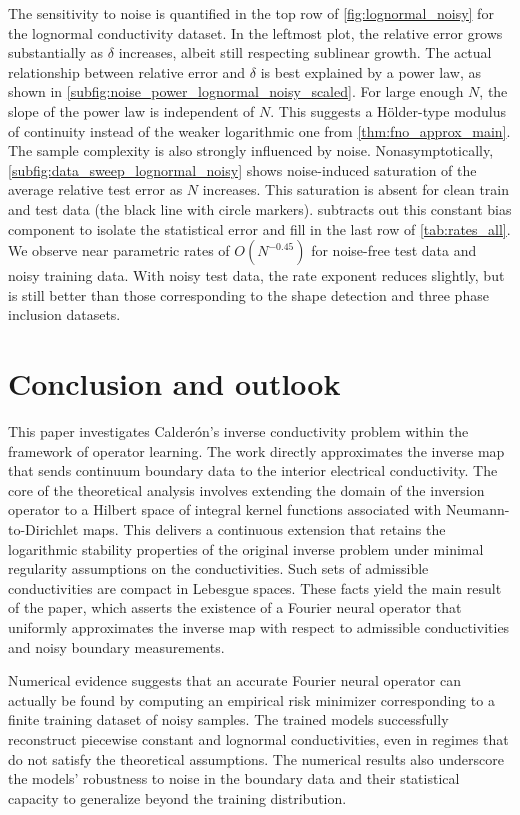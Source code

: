 \documentclass[pdflatex,sn-mathphys-num]{sn-jnl-preprint}
\theoremstyle{thmstyleone}%
\theoremstyle{thmstyletwo}%
\theoremstyle{thmstylethree}%
\numberwithin{equation}{section}
\numberwithin{theorem}{section}
\begin{document}
The sensitivity to noise is quantified in the top row of \cref{fig:lognormal_noisy} for the lognormal conductivity dataset. In the leftmost plot, the relative error grows substantially as $\delta$ increases, albeit still respecting sublinear growth. The actual relationship between relative error and $\delta$ is best explained by a power law, as shown in \cref{subfig:noise_power_lognormal_noisy_scaled}. For large enough $N$, the slope of the power law is independent of $N$. This suggests a H\"older-type modulus of continuity instead of the weaker logarithmic one from \cref{thm:fno_approx_main}. The sample complexity is also strongly influenced by noise. Nonasymptotically, \cref{subfig:data_sweep_lognormal_noisy} shows noise-induced saturation of the average relative test error as $N$ increases. This saturation is absent for clean train and test data (the black line with circle markers).  subtracts out this constant bias component to isolate the statistical error and fill in the last row of \cref{tab:rates_all}. We observe near parametric rates of $O(N^{-0.45})$ for noise-free test data and noisy training data. With noisy test data, the rate exponent reduces slightly, but is still better than those corresponding to the shape detection and three phase inclusion datasets.

\section{Conclusion and outlook}\label{sec:conclusion}
This paper investigates Calder\'on's inverse conductivity problem within the framework of operator learning. The work directly approximates the inverse map that sends continuum boundary data to the interior electrical conductivity. The core of the theoretical analysis involves extending the domain of the inversion operator to a Hilbert space of integral kernel functions associated with Neumann-to-Dirichlet maps. This delivers a continuous extension that retains the logarithmic stability properties of the original inverse problem under minimal regularity assumptions on the conductivities. Such sets of admissible conductivities are compact in Lebesgue spaces. These facts yield the main result of the paper, which asserts the existence of a Fourier neural operator that uniformly approximates the inverse map with respect to admissible conductivities and noisy boundary measurements.

Numerical evidence suggests that an accurate Fourier neural operator can actually be found by computing an empirical risk minimizer corresponding to a finite training dataset of noisy samples. The trained models successfully reconstruct piecewise constant and lognormal conductivities, even in regimes that do not satisfy the theoretical assumptions. The numerical results also underscore the models' robustness to noise in the boundary data and their statistical capacity to generalize beyond the training distribution. 
\end{document}
